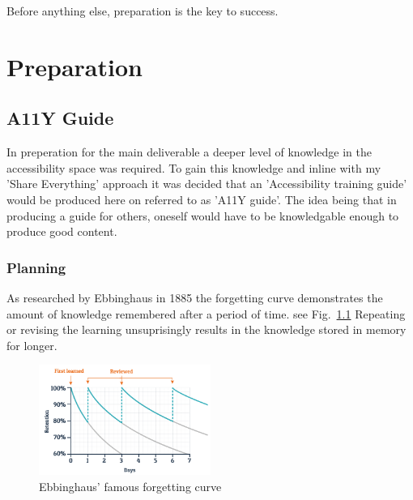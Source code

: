 \begin{savequote}[75mm]
Before anything else, preparation is the key to success.
\end{savequote}

\chapter{Preparation}
\section{A11Y Guide}
In preperation for the main deliverable a deeper level of knowledge in the
accessibility space was required. To gain this knowledge and inline with my
'Share Everything' approach it was decided that an 'Accessibility
training guide' would be produced here on referred to as 'A11Y guide'. The idea
being that in producing a guide for others, oneself would have to be
knowledgable enough to produce good content.

\subsection{Planning}

As researched by Ebbinghaus in 1885 the forgetting curve demonstrates the
amount of knowledge remembered after a period of time. see Fig.~\ref{fig:ebbinghaus}
Repeating or revising the learning unsuprisingly results in the knowledge
stored in memory for longer.

\begin{figure}[H]
\centering
\includegraphics[width=0.5\textwidth]{figures/ebbinghaus}
\captionsetup{justification=centering}
\caption[Short figure name.]{Ebbinghaus' famous forgetting curve
\label{fig:ebbinghaus}}
\end{figure}

